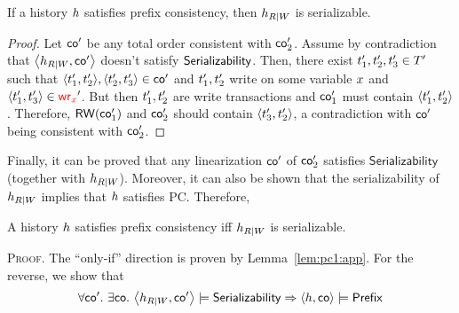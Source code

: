  

 \begin{lemma}\label{lem:pc1:app}
If a history $\hist$ satisfies prefix consistency, then $\hist_{R|W}$ is serializable.
\end{lemma}
 \begin{proof}
 Let $\co'$ be any total order consistent with $\co'_2$. Assume by contradiction that $\tup{\hist_{R|W},\co'}$ doesn't satisfy $\axser$. Then, there exist $\tr'_1, \tr'_2, \tr'_3 \in T'$ such that $\tup{\tr'_1, \tr'_2}, \tup{\tr'_2, \tr'_3} \in \co'$ and $\tr'_1, \tr'_2$ write on some variable $\xvar$ and $\tup{\tr'_1, \tr'_3} \in \wro[\xvar]'$. But then $\tr'_1, \tr'_2$ are write transactions and $\co'_1$ must contain $\tup{\tr'_1, \tr'_2}$. Therefore, $\rwo(\co'_1)$ and $\co'_2$ should contain $\tup{\tr'_3, \tr'_2}$, a contradiction with $\co'$ being consistent with $\co'_2$.
 \end{proof}

 
 Finally, it can be proved that any linearization $\co'$ of $\co'_2$ satisfies $\mathsf{Serializability}$ (together with $\hist_{R|W}$). Moreover, it can also be shown that the serializability of $\hist_{R|W}$ implies that $\hist$ satisfies PC. Therefore,

\begin{theorem}\label{th:pc}
A history $\hist$ satisfies prefix consistency iff $\hist_{R|W}$ is serializable.
\end{theorem}
\textsc{Proof.}
The ``only-if'' direction is proven by Lemma~\ref{lem:pc1:app}. For the reverse, we show that 
\begin{align*}
\forall \co'.\ \exists \co.\ \tup{\hist_{R|W}, \co'} \models \axser \Rightarrow \tup{\hist, \co} \models \axpre %
\end{align*}

%
 
